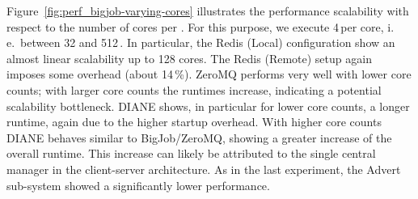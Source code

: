 \documentclass[conference]{IEEEtran}
\begin{document}
% 

Figure~\ref{fig:perf_bigjob-varying-cores} illustrates the performance
scalability with respect to the number of cores per \pilot. For this purpose, we
execute 4\,\cus per core, i.\,e.\ between 32 and 512\,\cus. In particular, the
Redis (Local) configuration show an almost linear scalability up to 128 cores.
The Redis (Remote) setup again imposes some overhead (about 14\,\%). ZeroMQ
performs very well with lower core counts; with larger core counts the runtimes
increase, indicating a potential scalability bottleneck. DIANE shows, in
particular for lower core counts, a longer runtime, again due to the higher
startup overhead. With higher core counts DIANE behaves similar to
BigJob/ZeroMQ, showing a greater increase of the overall runtime. This increase
can likely be attributed to the single central manager in the client-server
architecture. As in the last experiment, the Advert \cc sub-system showed a
significantly lower performance.
\end{document}

